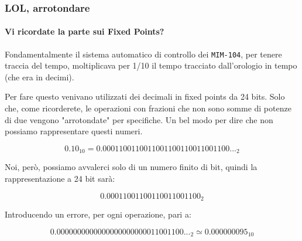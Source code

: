 \documentclass{beamer}
\begin{document}
	  \begin{frame}
	  		\frametitle{LOL, arrotondare}
	    \framesubtitle{Vi ricordate la parte sui Fixed Points?}
	  	    
	    Fondamentalmente il sistema automatico di controllo dei \texttt{MIM-104}, per tenere traccia
	    del tempo, moltiplicava per 1/10 il tempo tracciato dall'orologio in tempo (che era in decimi).
	    
	    Per fare questo venivano utilizzati dei decimali in fixed points da 24 bits. Solo che, come ricorderete,
	    le operazioni con frazioni che non sono somme di potenze di due vengono "arrotondate" per specifiche. Un
	    bel modo per dire che non possiamo rappresentare questi numeri.
	    
	    $$0.10_{10} = 0.0001100110011001100110011001100\text{...}_{2}$$
	    
	    Noi, però, possiamo avvalerci solo di un numero finito di bit, quindi la rappresentazione a 24 bit sarà:
	    
	    $$0.00011001100110011001100_{2}$$
	    
	    Introducendo un errore, per ogni operazione, pari a:
	    
	    $$0.0000000000000000000000011001100\text{...}_{2} \simeq 0.000000095_{10}$$
	  \end{frame}
	  
\end{document}
